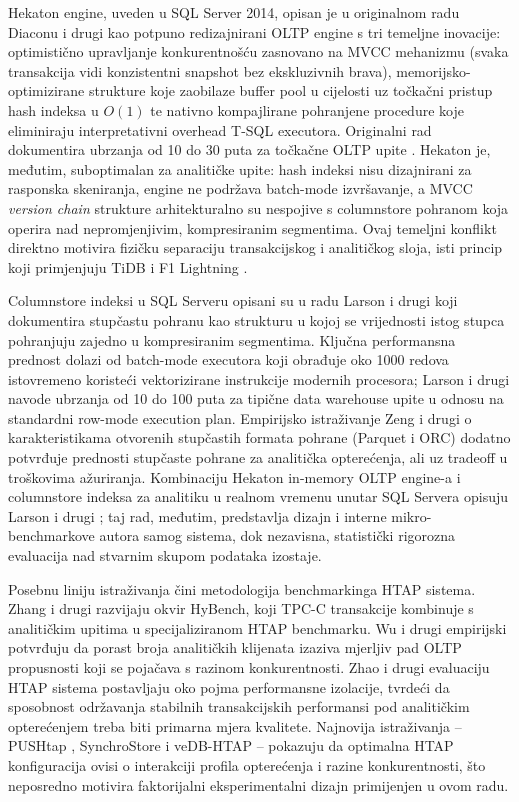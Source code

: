 Hekaton engine, uveden u SQL Server 2014, opisan je u originalnom radu Diaconu i drugi \cite{diaconu2013hekaton} kao potpuno redizajnirani OLTP engine s tri temeljne inovacije: optimistično upravljanje konkurentnošću zasnovano na MVCC mehanizmu (svaka transakcija vidi konzistentni snapshot bez ekskluzivnih brava), memorijsko-optimizirane strukture koje zaobilaze buffer pool u cijelosti uz točkačni pristup hash indeksa u $O(1)$ te nativno kompajlirane pohranjene procedure koje eliminiraju interpretativni overhead T-SQL executora. Originalni rad dokumentira ubrzanja od 10 do 30 puta za točkačne OLTP upite \cite{diaconu2013hekaton}. Hekaton je, međutim, suboptimalan za analitičke upite: hash indeksi nisu dizajnirani za rasponska skeniranja, engine ne podržava batch-mode izvršavanje, a MVCC \textit{version chain} strukture arhitekturalno su nespojive s columnstore pohranom koja operira nad nepromjenjivim, kompresiranim segmentima. Ovaj temeljni konflikt direktno motivira fizičku separaciju transakcijskog i analitičkog sloja, isti princip koji primjenjuju TiDB \cite{huang2020tidb} i F1 Lightning \cite{yang2020f1}.

Columnstore indeksi u SQL Serveru opisani su u radu Larson i drugi \cite{larson2013columnstore} koji dokumentira stupčastu pohranu kao strukturu u kojoj se vrijednosti istog stupca pohranjuju zajedno u kompresiranim segmentima. Ključna performansna prednost dolazi od batch-mode executora koji obrađuje oko 1000 redova istovremeno koristeći vektorizirane instrukcije modernih procesora; Larson i drugi \cite{larson2013columnstore} navode ubrzanja od 10 do 100 puta za tipične data warehouse upite u odnosu na standardni row-mode execution plan. Empirijsko istraživanje Zeng i drugi \cite{zeng2023empirical} o karakteristikama otvorenih stupčastih formata pohrane (Parquet i ORC) dodatno potvrđuje prednosti stupčaste pohrane za analitička opterećenja, ali uz tradeoff u troškovima ažuriranja. Kombinaciju Hekaton in-memory OLTP engine-a i columnstore indeksa za analitiku u realnom vremenu unutar SQL Servera opisuju Larson i drugi \cite{larson2015realtime}; taj rad, međutim, predstavlja dizajn i interne mikro-benchmarkove autora samog sistema, dok nezavisna, statistički rigorozna evaluacija nad stvarnim skupom podataka izostaje.

Posebnu liniju istraživanja čini metodologija benchmarkinga HTAP sistema. Zhang i drugi \cite{zhang2024hybench} razvijaju okvir HyBench, koji TPC-C transakcije kombinuje s analitičkim upitima u specijaliziranom HTAP benchmarku. Wu i drugi \cite{wu2025htap} empirijski potvrđuju da porast broja analitičkih klijenata izaziva mjerljiv pad OLTP propusnosti koji se pojačava s razinom konkurentnosti. Zhao i drugi \cite{zhao2023benchmarking} evaluaciju HTAP sistema postavljaju oko pojma performansne izolacije, tvrdeći da sposobnost održavanja stabilnih transakcijskih performansi pod analitičkim opterećenjem treba biti primarna mjera kvalitete. Najnovija istraživanja -- PUSHtap \cite{zhao2025pushtap}, SynchroStore \cite{zhang2025synchro} i veDB-HTAP \cite{zhan2025vedb} -- pokazuju da optimalna HTAP konfiguracija ovisi o interakciji profila opterećenja i razine konkurentnosti, što neposredno motivira faktorijalni eksperimentalni dizajn primijenjen u ovom radu.

